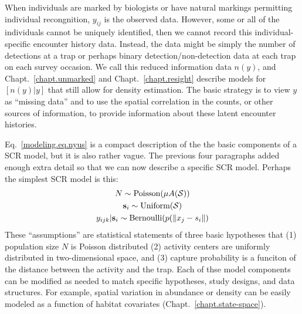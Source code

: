 When individuals are marked by biologists or have natural markings
permitting individual recongnition, $y_{ij}$ is the observed
data. However, some or all of the individuals cannot be uniquely
identified, then we cannot record this individual-specific encounter
history data. Instead, the data might be simply the number of
detections at a trap or perhaps binary detection/non-detection data at
each trap on each survey occasion. We call this reduced information data $n(y)$, and
Chapt.~\ref{chapt.unmarked} and Chapt.~\ref{chapt.resight} describe
models for $[n(y)|y]$ that still allow for density estimation. The
basic strategy is to view $y$ as ``missing
data'' and to use the spatial correlation in the counts, or other
sources of information, to provide information about these latent
encounter histories.

Eq.~\ref{modeling.eq.nyus} is a compact description of the the basic components of a
SCR model, but it is also rather vague. The previous four paragraphs
added enough extra detail so that we can now describe a specific SCR
model. Perhaps the simplest SCR model is this:
\begin{gather}
N \sim \text{Poisson}(\mu A(\mathcal{S})) \nonumber \\
{\bf s}_{i} \sim \mbox{Uniform}({\cal S}) \label{modeling.eq.scr0} \\
y_{ijk} | {\bf s}_{i} \sim \mbox{Bernoulli}(p(\| x_j - s_{i} \|) \nonumber
\end{gather}
These ``assumptions'' are statistical statements of three basic hypotheses
that (1) population size $N$ is Poisson distributed
(2) activity centers are uniformly distributed in two-dimensional
space,
and (3) capture probability is a funciton of the distance
between the activity and the trap. Each of thse model components can be
modified as needed to match specific hypotheses, study designs, and data
structures. For example, spatial variation in abundance or density can
be easily modeled as a function of habitat covariates
(Chapt.~\ref{chapt.state-space}). %

